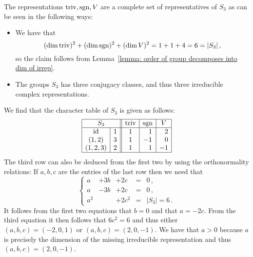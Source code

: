 \begin{example}
  The representations $\operatorname{triv}, \operatorname{sgn}, V$ are a complete set of representatives of $S_3$ as can be seen in the following ways:
  \begin{itemize}
    \item
      We have that
      \[
          (\dim \operatorname{triv})^2
        + (\dim \operatorname{sgn})^2
        + (\dim V)^2
        = 1 + 1 + 4
        = 6
        = |S_3| \,,
      \]
      so the claim follows from Lemma~\ref{lemma: order of group decomposes into dim of irrep}.
    \item
      The groups $S_3$ has three conjugacy classes, and thus three irreducible complex representations.
  \end{itemize}
  We find that the character table of $S_3$ is given as follows:
  \[
    \begin{array}{|c|c||c|c|c|}
      \hline
        \multicolumn{2}{|c||}{S_3}
      & \triv
      & \sgn
      & V
      \\
      \hline
        \id
      & 1
      &            1
      & \phantom{-}1
      & \phantom{-}2
      \\
        (1,2)
      & 3
      &            1
      &           -1
      & \phantom{-}0
      \\
        (1,2,3)
      & 2
      &            1
      & \phantom{-}1
      &           -1
      \\
      \hline
    \end{array}
  \]
  The third row can also be deduced from the first two by using the orthonormality relations:
  If $a, b, c$ are the entries of the last row then we need that
  \[
    \left\{
      \begin{array}{lllcl}
         a   & + 3b & + 2c    &=& 0 \,, \\
         a   & - 3b & + 2c    &=& 0 \,, \\
         a^2 &      & + 2c^2  &=& |S_3| = 6 \,.
      \end{array}
    \right.
  \]
  It follows from the first two equations that $b = 0$ and that $a = -2c$.
  From the third equation it then follows that $6c^2 = 6$ and thus either $(a,b,c) = (-2,0,1)$ or $(a,b,c) = (2,0,-1)$.
  We have that $a > 0$ because $a$ is precisely the dimension of the missing irreducible representation and thus $(a,b,c) = (2,0,-1)$.
\end{example}


